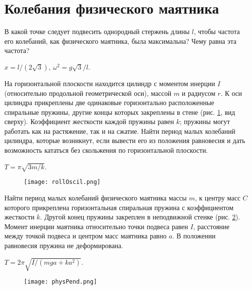 \section{Колебания физического маятника}

\introProblems

\begin{ex} %
В какой точке следует подвесить однородный стержень длины  $l$, чтобы частота его колебаний, как физического маятника, была максимальна? Чему равна эта частота?
\begin{ans}
$x = l/(2\sqrt{3})$, $\omega^2 = g\sqrt{3} / l$.
\end{ans}
\end{ex}	

\begin{ex} %
На горизонтальной плоскости находится цилиндр с моментом инерции $I$ (относительно продольной геометрической оси), массой $m$ и радиусом $r$. К оси цилиндра прикреплены две одинаковые горизонтально расположенные спиральные пружины, другие концы которых закреплены в стене (рис. \ref{rollOscil}, вид сверху). Коэффициент жесткости каждой пружины равен $k$; пружины могут работать как на растяжение, так и на сжатие. Найти период малых колебаний цилиндра, которые возникнут, если вывести его из положения равновесия и дать возможность кататься без скольжения по горизонтальной плоскости.
\begin{ans}
$T =  \pi\sqrt{3m/k}$.
\end{ans}
\end{ex}	

\begin{figure}[h]
\centering
\texttt{[image: rollOscil.png]}
\caption{}
\label{rollOscil}
\end{figure}

\begin{ex} %
Найти период малых колебаний физического маятника массы $m$, к центру масс $C$ которого прикреплена горизонтальная спиральная пружина с коэффициентом жесткости $k$. Другой конец пружины закреплен в неподвижной стенке (рис. \ref{physPend}). Момент инерции маятника относительно точки подвеса равен $I$, расстояние между точкой подвеса и центром масс маятника равно $a$. В положении равновесия пружина не деформирована.
\begin{ans}
$T = 2 \pi \sqrt{I/(mga + ka^2)}$.
\end{ans}
\end{ex}	

\begin{figure}[h]
\centering
\texttt{[image: physPend.png]}
\caption{}
\label{physPend}
\end{figure}

